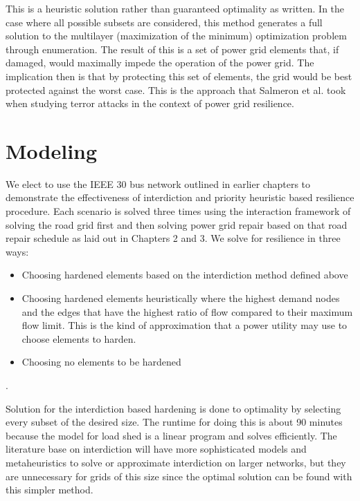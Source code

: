 This is a heuristic solution rather than guaranteed optimality as written. In the case where all possible subsets are considered, this method generates a full solution to the multilayer (maximization of the minimum) optimization problem through enumeration. The result of this is a set of power grid elements that, if damaged, would maximally impede the operation of the power grid. The implication then is that by protecting this set of elements, the grid would be best protected against the worst case. This is the approach that Salmeron et al. \cite{Salmeron2004} took when studying terror attacks in the context of power grid resilience.
\section{Modeling}
We elect to use the IEEE 30 bus network outlined in earlier chapters to demonstrate the effectiveness of interdiction and priority heuristic based resilience procedure. Each scenario is solved three times using the interaction framework of solving the road grid first and then solving power grid repair based on that road repair schedule as laid out in Chapters 2 and 3. We solve for resilience in three ways:
\begin{itemize}
	\item Choosing hardened elements based on the interdiction method defined above
	\item Choosing hardened elements heuristically where the highest demand nodes and the edges that have the highest ratio of flow compared to their maximum flow limit. This is the kind of approximation that a power utility may use to choose elements to harden.
	\item Choosing no elements to be hardened
\end{itemize}.


Solution for the interdiction based hardening is done to optimality by selecting every subset of the desired size. The runtime for doing this is about 90 minutes because the model for load shed is a linear program and solves efficiently. The literature base on interdiction will have more sophisticated models and metaheuristics to solve or approximate interdiction on larger networks, but they are unnecessary for grids of this size since the optimal solution can be found with this simpler method.


